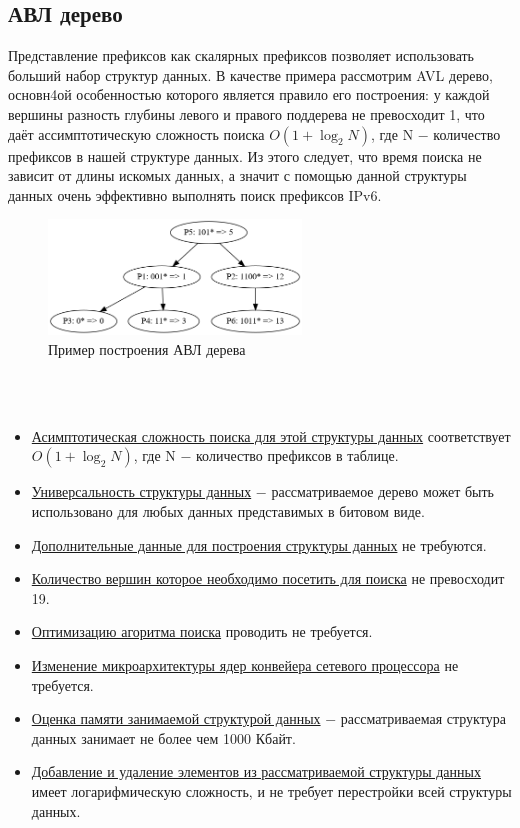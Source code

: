 \documentclass[a4peper, 12pt, titlepage, finall]{report}
\begin{document}
        \subsection{АВЛ дерево}
            Представление префиксов как скалярных префиксов позволяет использовать больший набор структур данных. 
            В качестве примера рассмотрим AVL дерево, основн4ой особенностью которого является правило его построения: у каждой вершины разность 
            глубины левого и правого поддерева не превосходит 1, что даёт ассимптотическую сложность поиска {\ttfamily $O(1+\log_2{N})$}, 
            где {\ttfamily N} $-$ количество префиксов в нашей структуре данных. Из этого следует, что время поиска не зависит от длины искомых данных,
            а значит с помощью данной структуры данных очень эффективно выполнять поиск префиксов IPv6.
            \\
            \begin{figure}[ht]
                \centering
                \includegraphics[width=0.6\textwidth]{avl_tree.png}
                \caption{Пример построения АВЛ дерева}\label{fig:mesh5}
            \end{figure}
            \\
            \\
            \begin{itemize}
                \item\underline{Асимптотическая сложность поиска для этой структуры данных} соответствует {\ttfamily $O(1 + \log_2{N})$},
                где {\ttfamily N} $-$ количество префиксов в таблице.
                \item\underline{Универсальность структуры данных} $-$ рассматриваемое дерево может быть использовано для любых данных представимых в битовом виде.
                \item\underline{Дополнительные данные для построения структуры данных} не требуются.
                \item\underline{Количество вершин которое необходимо посетить для поиска} не превосходит 19.
                \item\underline{Оптимизацию агоритма поиска} проводить не требуется.
                \item\underline{Изменение микроархитектуры ядер конвейера сетевого процессора} не требуется.
                \item\underline{Оценка памяти занимаемой структурой данных} $-$ рассматриваемая структура данных занимает не более чем 1000 Кбайт.
                \item\underline{Добавление и удаление элементов из рассматриваемой структуры данных} имеет логарифмическую сложность, и не требует перестройки всей структуры данных.
            \end{itemize}
\end{document}
